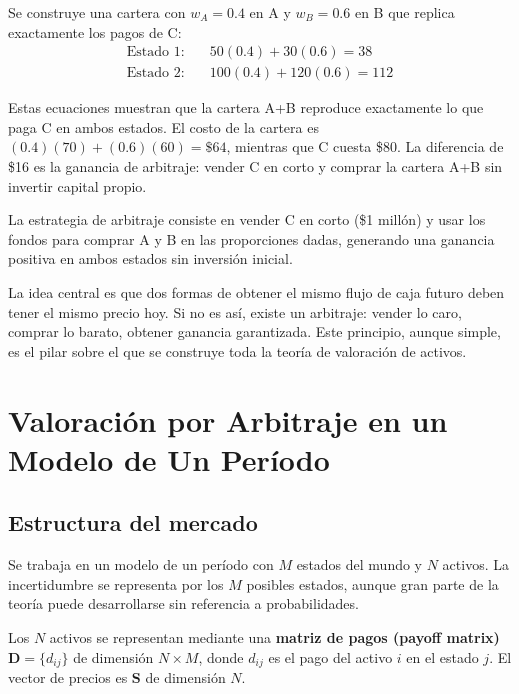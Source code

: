 \documentclass[12pt]{article}
\begin{document}
Se construye una cartera con $w_A = 0.4$ en A y $w_B = 0.6$ en B que replica exactamente los pagos de C:
\begin{align}
\text{Estado 1:} &\quad 50(0.4) + 30(0.6) = 38 \\
\text{Estado 2:} &\quad 100(0.4) + 120(0.6) = 112
\end{align}

\begin{intuicionmat}
Estas ecuaciones muestran que la cartera A+B reproduce exactamente lo que paga C en ambos estados. El costo de la cartera es $(0.4)(70) + (0.6)(60) = \$64$, mientras que C cuesta \$80. La diferencia de \$16 es la ganancia de arbitraje: vender C en corto y comprar la cartera A+B sin invertir capital propio.
\end{intuicionmat}

La estrategia de arbitraje consiste en vender C en corto (\$1 mill\'on) y usar los fondos para comprar A y B en las proporciones dadas, generando una ganancia positiva en ambos estados sin inversi\'on inicial.

\begin{intuicion}
La idea central es que dos formas de obtener el mismo flujo de caja futuro deben tener el mismo precio hoy. Si no es as\'i, existe un arbitraje: vender lo caro, comprar lo barato, obtener ganancia garantizada. Este principio, aunque simple, es el pilar sobre el que se construye toda la teor\'ia de valoraci\'on de activos.
\end{intuicion}

\section{Valoraci\'on por Arbitraje en un Modelo de Un Per\'iodo}

\subsection{Estructura del mercado}

Se trabaja en un modelo de un per\'iodo con $M$ estados del mundo y $N$ activos. La incertidumbre se representa por los $M$ posibles estados, aunque gran parte de la teor\'ia puede desarrollarse sin referencia a probabilidades.

Los $N$ activos se representan mediante una \textbf{matriz de pagos (payoff matrix)} $\mathbf{D} = \{d_{ij}\}$ de dimensi\'on $N \times M$, donde $d_{ij}$ es el pago del activo $i$ en el estado $j$. El vector de precios es $\mathbf{S}$ de dimensi\'on $N$.
\end{document}
